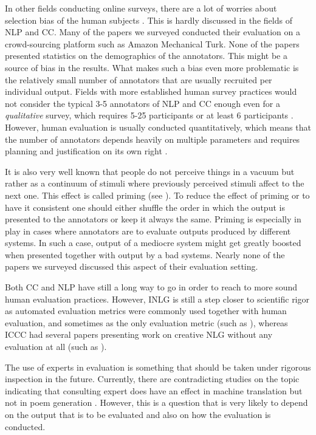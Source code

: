 \documentclass[11pt,a4paper]{article}
\begin{document}
In other fields conducting online surveys, there are a lot of worries about selection bias of the human subjects \cite{bethlehem2010selection,greenacre2016importance}. This is hardly discussed in the fields of NLP and CC. Many of the papers we surveyed conducted their evaluation on a crowd-sourcing platform such as Amazon Mechanical Turk. None of the papers presented statistics on the demographics of the annotators. This might be a source of bias in the results. What makes such a bias even more problematic is the relatively small number of annotators that are usually recruited per individual output. Fields with more established human survey practices would not consider the typical 3-5 annotators of NLP and CC enough even for a \textit{qualitative} survey, which requires 5-25 participants \cite{creswell2016qualitative} or at least 6 participants \cite{morse1994designing}. However, human evaluation is usually conducted quantitatively, which means that the number of annotators depends heavily on multiple parameters and requires planning and justification on its own right \cite{bell1991big,lenth2001some,lavrakas2008encyclopedia}.

It is also very well known that people do not perceive things in a vacuum but rather as a continuum of stimuli where previously perceived stimuli affect to the next one. This effect is called priming (see \citealt{bloom2009encyclopedia}). To reduce the effect of priming or to have it consistent one should either shuffle the order in which the output is presented to the annotators or keep it always the same. Priming is especially in play in cases where annotators are to evaluate outputs produced by different systems. In such a case, output of a mediocre system might get greatly boosted when presented together with output by a bad systems. Nearly none of the papers we surveyed discussed this aspect of their evaluation setting.

Both CC and NLP have still a long way to go in order to reach to more sound human evaluation practices. However, INLG is still a step closer to scientific rigor as automated evaluation metrics were commonly used together with human evaluation, and sometimes as the only evaluation metric (such as \citealt{bien-etal-2020-recipenlg}), whereas ICCC had several papers presenting work on creative NLG without any evaluation at all (such as \citealt{agafonovaparanoid,petacpragmatics,wright2020creative}).

The use of experts in evaluation is something that should be taken under rigorous inspection in the future. Currently, there are contradicting studies on the topic indicating that consulting expert does have an effect in machine translation \cite{toral2018attaining} but not in poem generation \cite{lamb2017incorporating}. However, this is a question that is very likely to depend on the output that is to be evaluated and also on how the evaluation is conducted. 
\end{document}
